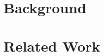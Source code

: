 \documentclass[mestrado]{pacotes/unb-cic}
\begin{document}
\chapter{Background}

%
%
%
%
%
%


\chapter{Related Work}
%
%
%
%
%
%




%
%
%

\postextual
\anexos




\end{document}
